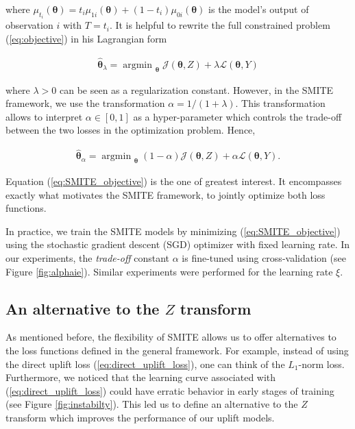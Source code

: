 \documentclass{article}
\DeclareMathOperator*{\argmin}{argmin~} %
\begin{document}
where $\mu_{t_i}(\boldsymbol{\theta}) = t_i \mu_{1i}(\boldsymbol{\theta}) + (1-t_i) \mu_{0i}(\boldsymbol{\theta})$ is the model's output of observation $i$ with $T=t_i$. It is helpful to rewrite the full constrained problem (\ref{eq:objective}) in his Lagrangian form

\begin{align*}
    {\boldsymbol{\hat\theta}}_{\lambda} =  \argmin_{\boldsymbol{\theta}} \mathcal{J}(\boldsymbol{\theta}, Z)+ \lambda  \mathcal{L}(\boldsymbol{\theta}, Y)
\end{align*}

where $\lambda > 0$ can be seen as a regularization constant. However, in the SMITE framework, we use the transformation $\alpha = 1 / (1+\lambda)$. This transformation allows to interpret $\alpha \in [0,1]$ as a hyper-parameter which controls the trade-off between the two losses in the optimization problem. Hence,

\begin{align}
    {\boldsymbol{\hat\theta}}_{\alpha} = \argmin_{\boldsymbol{\theta}} (1 - \alpha) \mathcal{J}(\boldsymbol{\theta}, Z)+ \alpha  \mathcal{L}(\boldsymbol{\theta}, Y).
    \label{eq:SMITE_objective}
\end{align}

Equation (\ref{eq:SMITE_objective}) is the one of greatest interest. It encompasses exactly what motivates the SMITE framework, to jointly optimize both loss functions. 

In practice, we train the SMITE models by minimizing (\ref{eq:SMITE_objective}) using the stochastic gradient descent (SGD) optimizer with fixed learning rate. In our experiments, the {\it trade-off} constant $\alpha$ is fine-tuned using cross-validation (see Figure \ref{fig:alphaie}). Similar experiments were performed for the learning rate $\xi$.

\subsection{An alternative to the $Z$ transform} \label{j2}

As mentioned before, the flexibility of SMITE allows us to offer alternatives to the loss functions defined in the general framework. For example, instead of using the direct uplift loss (\ref{eq:direct_uplift_loss}), one can think of the $L_1$-norm loss. Furthermore, we noticed that the learning curve associated with (\ref{eq:direct_uplift_loss}) could have erratic behavior in early stages of training (see Figure \ref{fig:instabilty}). This led us to define an alternative to the $Z$ transform which improves the performance of our uplift models.
\end{document}
